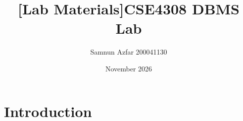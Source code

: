 \documentclass{article}
\title{[Lab Materials]CSE4308 DBMS Lab}
\author{Samnun Azfar 200041130}
\date{November 2026}
\begin{document}
\maketitle

\section{Introduction}
\end{document}
